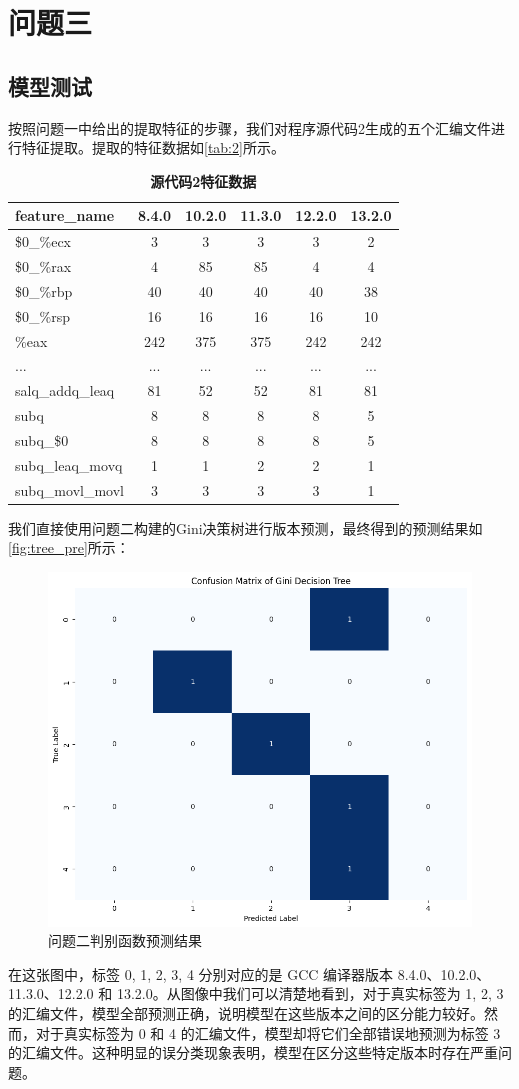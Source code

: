 
\section{问题三}
\subsection{模型测试}
按照问题一中给出的提取特征的步骤，我们对程序源代码2生成的五个汇编文件进行特征提取。提取的特征数据如\autoref{tab:2}所示。
\begin{table}[H]
\caption{\textbf{源代码2特征数据}}%
\label{tab:2}
\centering%
\begin{tabular}{lccccc}%
\toprule%
 feature\_name&8.4.0 & 10.2.0 & 11.3.0 & 12.2.0 & 13.2.0 \\
\midrule%
\$0\_\%ecx&3&3&3&3&2 \\
\$0\_\%rax&4 & 85 & 85 & 4 & 4 \\
\$0\_\%rbp&40 & 40 & 40 & 40 & 38 \\
\$0\_\%rsp&16 & 16 & 16 & 16 & 10 \\
\%eax & 242 & 375 & 375 & 242&242 \\
...&... & ... & ... & ... & ... \\
salq\_addq\_leaq&81 & 52 & 52 & 81 & 81 \\
subq&8 & 8 & 8 & 8 & 5 \\
subq\_\$0&8 & 8 & 8 & 8 & 5 \\
subq\_leaq\_movq&1 & 1 & 2 & 2 & 1 \\
subq\_movl\_movl&3 & 3 & 3 & 3 & 1 \\
\bottomrule%
\end{tabular}
\end{table}

我们直接使用问题二构建的Gini决策树进行版本预测，最终得到的预测结果如\autoref{fig:tree_pre}所示：
\begin{figure}[H]
    \centering
    \includegraphics[width=0.75\linewidth]{figures/tree_pre.png}
    \caption{问题二判别函数预测结果}
    \label{fig:tree_pre}
\end{figure}
在这张图中，标签 0, 1, 2, 3, 4 分别对应的是 GCC 编译器版本 8.4.0、10.2.0、11.3.0、12.2.0 和 13.2.0。从图像中我们可以清楚地看到，对于真实标签为 1, 2, 3 的汇编文件，模型全部预测正确，说明模型在这些版本之间的区分能力较好。然而，对于真实标签为 0 和 4 的汇编文件，模型却将它们全部错误地预测为标签 3 的汇编文件。这种明显的误分类现象表明，模型在区分这些特定版本时存在严重问题。

